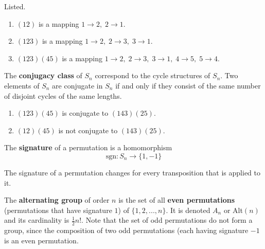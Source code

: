 \documentclass{article}
\begin{document}
      \begin{example}
        Listed.
        \begin{enumerate}
          \item $(1 2)$ is a mapping $1 \rightarrow 2,\; 2 \rightarrow 1$. 
          \item $(1 2 3)$ is a mapping $1\rightarrow 2,\; 2 \rightarrow 3,\; 3 \rightarrow 1$. 
          \item $(1 2 3) (4 5)$ is a mapping $1\rightarrow 2,\; 2 \rightarrow 3,\; 3 \rightarrow 1, \;4 \rightarrow 5, \;5 \rightarrow 4$. 
        \end{enumerate}
      \end{example}

      \begin{definition}
        The \textbf{conjugacy class} of $S_{n}$ correspond to the cycle structures of $S_{n}$. Two elements of $S_{n}$ are conjugate in $S_{n}$ if and only if they consist of the same number of disjoint cycles of the same lengths. 
      \end{definition}

      \begin{example}
        \begin{enumerate}
          \item $(1 2 3) (4 5)$ is conjugate to $(1 4 3) (2 5)$.
          \item $(1 2) (4 5)$ is not conjugate to $(1 4 3) (2 5)$. 
        \end{enumerate}
      \end{example}

      \begin{definition}
        The \textbf{signature} of a permutation is a homomorphism
        \begin{equation}
          \text{sgn}: S_{n} \longrightarrow \{1, -1\}
        \end{equation}
      \end{definition}

      \begin{proposition}
        The signature of a permutation changes for every transposition that is applied to it. 
      \end{proposition}

      \begin{definition}
        The \textbf{alternating group} of order $n$ is the set of all \textbf{even permutations} (permutations that have signature $1$) of $\{1, 2, ..., n\}$. It is denoted $A_{n}$ or Alt$(n)$ and its cardinality is $\frac{1}{2} n!$. Note that the set of odd permutations do not form a group, since the composition of two odd permutations (each having signature $-1$ is an even permutation. 
      \end{definition}
\end{document}

